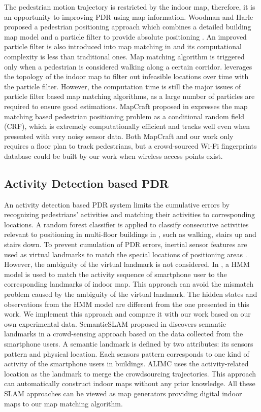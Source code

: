 \documentclass{llncs}
\begin{document}
The pedestrian motion trajectory is restricted by the indoor map, therefore, it is an opportunity to improving PDR using map information. Woodman and Harle proposed a pedestrian positioning approach which combines a detailed building map model and a particle filter to provide absolute positioning \cite{woodman2008pedestrian}. An improved particle filter is also introduced into map matching in \cite{bao2013indoor} and its computational complexity is less than traditional ones. Map matching algorithm is triggered only when a pedestrian is considered walking along a certain corridor. \cite{rai2012zee} leverages the topology of the indoor map to filter out infeasible locations over time with the particle filter. However, the computation time is still the major issues of particle filter based map matching algorithms, as a large number of particles are required to ensure good estimations. MapCraft proposed in \cite{xiao2014lightweight} expresses the map matching based pedestrian positioning problem as a conditional random field (CRF), which is extremely computationally efficient and tracks well even when presented with very noisy sensor data. Both MapCraft and our work only requires a floor plan to track pedestrians, but a crowd-sourced Wi-Fi fingerprints database could be built by our work when wireless access points exist. 

\subsection{Activity Detection based PDR}

An activity detection based PDR system limits the cumulative errors by recognizing pedestrians' activities and matching their activities to corresponding locations. A random forest classifier is applied to classify consecutive activities relevant to positioning in multi-floor buildings in \cite{bobkov2015activity}, such as walking, stairs up and stairs down. To prevent cumulation of PDR errors, inertial sensor features are used as virtual landmarks to match the special locations of positioning areas \cite{guo2017activity}. However, the ambiguity of the virtual landmark is not considered. In \cite{zhou2015activity}, a HMM model is used to match the activity sequence of smartphone user to the corresponding landmarks of indoor map. This approach can avoid the mismatch problem caused by the ambiguity of the virtual landmark. The hidden states and observations from the HMM model are different from the one presented in this work. We implement this approach and compare it with our work based on our own experimental data. SemanticSLAM proposed in \cite{abdelnasser2016semanticslam} discovers semantic landmarks in a crowd-sensing approach based on the data collected from the smartphone users. A semantic landmark is defined by two attributes: its sensors pattern and physical location. Each sensors pattern corresponds to one kind of activity of the smartphone users in buildings. ALIMC \cite{zhou2015alimc} uses the activity-related location as the landmark to merge the crowdsourcing trajectories. This approach can automatically construct indoor maps without any prior knowledge. All these SLAM approaches can be viewed as map generators providing digital indoor maps to our map matching algorithm.
\end{document}
